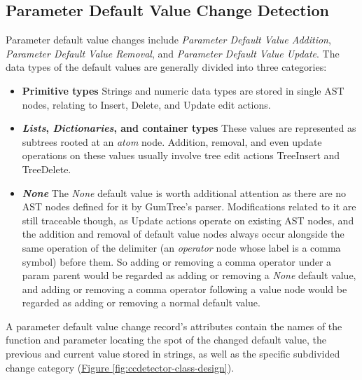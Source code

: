 \subsection{Parameter Default Value Change Detection}

Parameter default value changes include \textit{Parameter Default Value Addition}, \textit{Parameter Default Value Removal}, and \textit{Parameter Default Value Update}. The data types of the default values are generally divided into three categories:

\begin{itemize}
	\item \textbf{Primitive types} Strings and numeric data types are stored in single AST nodes, relating to Insert, Delete, and Update edit actions.
	\item \textbf{\textit{Lists}, \textit{Dictionaries}, and container types} These values are represented as subtrees rooted at an \textit{atom} node. Addition, removal, and even update operations on these values usually involve tree edit actions TreeInsert and TreeDelete.
	\item \textbf{\textit{None}} The \textit{None} default value is worth additional attention as there are no AST nodes defined for it by GumTree's parser. Modifications related to it are still traceable though, as Update actions operate on existing AST nodes, and the addition and removal of default value nodes always occur alongside the same operation of the delimiter (an \textit{operator} node whose label is a comma symbol) before them. So adding or removing a comma operator under a param parent would be regarded as adding or removing a \textit{None} default value, and adding or removing a comma operator following a value node would be regarded as adding or removing a normal default value.
\end{itemize}

A parameter default value change record's attributes contain the names of the function and parameter locating the spot of the changed default value, the previous and current value stored in strings, as well as the specific subdivided change category (\hyperref[fig:ccdetector-class-design]{Figure \ref*{fig:ccdetector-class-design}}).

